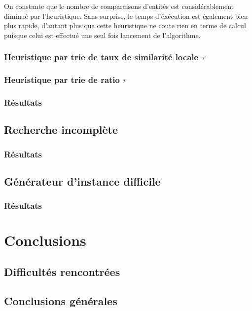 \documentclass[a4paper,10pt]{article}
\begin{document}
On constante que le nombre de comparaisons d'entités est considérablement diminué par l'heuristique. Sans surprise, le temps d'éxécution est également bien plus rapide, d'autant plus que cette heuristique ne coute rien en terme de calcul puisque celui est effectué une seul fois lancement de l'algorithme.

\subsubsection{Heuristique par trie de taux de similarité locale $\tau$}
\subsubsection{Heuristique par trie de ratio $r$}

\subsubsection{Résultats}

\subsection{Recherche incomplète}
\subsubsection{Résultats}

\subsection{Générateur d'instance difficile}
\subsubsection{Résultats}

\section{Conclusions} 

\subsection{Difficultés rencontrées}

\subsection{Conclusions générales}
\end{document}
